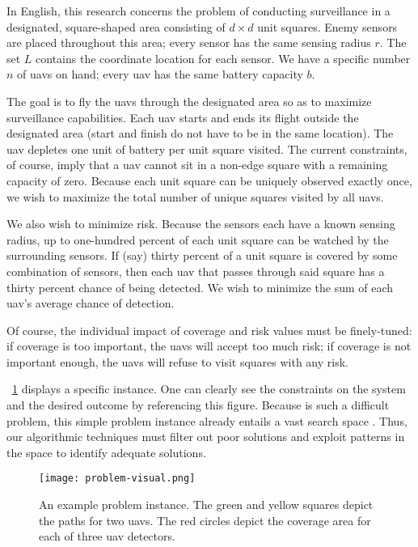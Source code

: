 \documentclass[../main.tex]{subfiles}
\begin{document}
In English, this research concerns the problem of conducting surveillance in a designated, square-shaped area consisting of $d\times d$ unit squares. Enemy sensors are placed throughout this area; every sensor has the same sensing radius $r$. The set $L$ contains the coordinate location for each sensor. We have a specific number $n$ of \acp{uav} on hand; every \ac{uav} has the same battery capacity $b$.

The goal is to fly the \acp{uav} through the designated area so as to maximize surveillance capabilities. Each \ac{uav} starts and ends its flight outside the designated area (start and finish do not have to be in the same location). The \ac{uav} depletes one unit of battery per unit square visited. The current constraints, of course, imply that a \ac{uav} cannot sit in a non-edge square with a remaining capacity of zero. Because each unit square can be uniquely observed exactly once, we wish to maximize the total number of unique squares visited by all \acp{uav}.

We also wish to minimize risk. Because the sensors each have a known sensing radius, up to one-hundred percent of each unit square can be watched by the surrounding sensors. If (say) thirty percent of a unit square is covered by some combination of sensors, then each \ac{uav} that passes through said square has a thirty percent chance of being detected. We wish to minimize the sum of each \ac{uav}'s average chance of detection.

Of course, the individual impact of coverage and risk values must be finely-tuned: if coverage is too important, the \acp{uav} will accept too much risk; if coverage is not important enough, the \acp{uav} will refuse to visit squares with any risk.

\figurename \ \ref{fig:problem-visual} displays a specific \probs instance. One can clearly see the constraints on the system and the desired outcome by referencing this figure. Because \probs is such a difficult problem, this simple problem instance already entails a vast search space \cite{Liu2018, Caska2016, Lamont2007}. Thus, our algorithmic techniques must filter out poor solutions and exploit patterns in the space to identify adequate solutions.

\begin{figure}
    \centerline{\texttt{[image: problem-visual.png]}}
    \caption{An example problem instance. The green and yellow squares depict the paths for two \acp{uav}. The red circles depict the coverage area for each of three \ac{uav} detectors.}
    \label{fig:problem-visual}
\end{figure}
\end{document}
